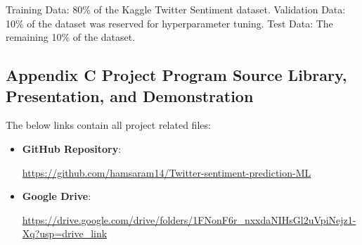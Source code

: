\documentclass[journal]{IEEEtran}
\begin{document}
Training Data: 80\% of the Kaggle Twitter Sentiment dataset.
Validation Data: 10\% of the dataset was reserved for hyperparameter tuning.
Test Data: The remaining 10\% of the dataset.

\subsection{\textbf{Appendix C Project Program Source Library, Presentation, and Demonstration}}
The below links contain all project related files:
\begin{itemize}
    \item \textbf{GitHub Repository}: 
    
    \url{https://github.com/hamsaram14/Twitter-sentiment-prediction-ML}
    \item \textbf{Google Drive}: 
    
    \url{https://drive.google.com/drive/folders/1FNonF6r_nxxdaNIHsGl2uVpiNejz1-Xq?usp=drive_link}
\end{itemize}
\end{document}
